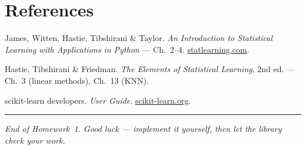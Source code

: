\documentclass[11pt,a4paper]{article}
\newcommand{\hwnumber}{1}
\begin{document}
\section*{References}
\begin{enumerate}[label={[\arabic*]},leftmargin=2.4em,itemsep=2pt]
  \item James, Witten, Hastie, Tibshirani \& Taylor. \emph{An Introduction to Statistical Learning with Applications in Python} --- Ch.\ 2--4. \href{https://www.statlearning.com}{statlearning.com}.
  \item Hastie, Tibshirani \& Friedman. \emph{The Elements of Statistical Learning}, 2nd ed. --- Ch.\ 3 (linear methods), Ch.\ 13 (KNN).
  \item scikit-learn developers. \emph{User Guide}. \href{https://scikit-learn.org/stable/}{scikit-learn.org}.
\end{enumerate}

\vspace{1em}\hrule\vspace{0.6em}
\noindent\small\textit{End of Homework~\hwnumber. Good luck --- implement it yourself, then let the library check your work.}
\end{document}

